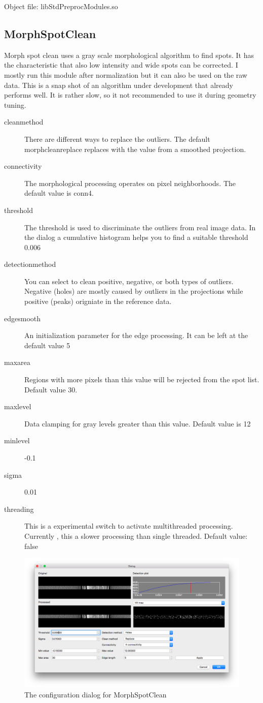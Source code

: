 \documentclass[a4paper]{scrreprt}
\begin{document}
Object file: libStdPreprocModules.so

\subsection{MorphSpotClean}
Morph spot clean uses a gray scale morphological algorithm to find spots. It has the characteristic that also low intensity and wide spots can be corrected. I mostly run this module after normalization but it can also be used on the raw data.
This is a snap shot of an algorithm under development that already performs well. It is rather slow, so it not recommended to use it during geometry tuning. 
\begin{description}
\item[cleanmethod] There are different ways to replace the outliers. The default morphcleanreplace replaces with the value from a smoothed projection. 
\item[connectivity] The morphological processing operates on pixel neighborhoods. The default value is conn4.
\item[threshold] The threshold is used to discriminate the outliers from real image data. In the dialog a cumulative histogram helps you to find a suitable threshold 0.006
\item[detectionmethod] You can select to clean positive, negative, or both types of outliers. Negative (holes) are mostly caused by outliers in the projections while positive (peaks) origniate in the reference data.
\item[edgesmooth] An initialization parameter for the edge processing. It can be left at the default value 5
\item[maxarea] Regions with more pixels than this value will be rejected from the spot list. Default value 30.
\item[maxlevel] Data clamping for gray levels greater than this value. Default value is 12
\item[minlevel]-0.1
\item[sigma]0.01
\item[threading] This is a experimental switch to activate multithreaded processing. Currently , this a slower processing than single threaded. Default value: false
\end{description}
\begin{figure}
\includegraphics[width=\textwidth]{figures3/Dialog_MorphSpotClean.png}
\caption{The configuration dialog for MorphSpotClean}
\end{figure}
\end{document}
